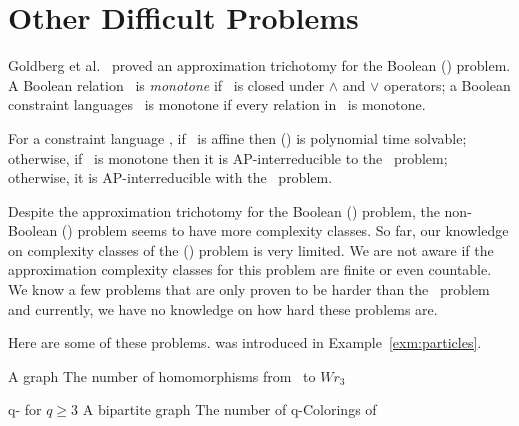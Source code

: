 \section{Other Difficult Problems}
Goldberg et al.~\cite{Trichotomy} proved an approximation trichotomy for the Boolean
\ccsp(\mrelset) problem. A Boolean relation \mR\ is \emph{monotone} if \mR\ is closed under
\(\land\) and \(\lor\) operators; a Boolean constraint languages \mrelset\ is monotone if 
every relation in \mrelset\ is monotone.


\begin{theorem}
For a constraint language \mrelset,
if \mrelset\ is affine then \ccsp(\mrelset) is polynomial time solvable; otherwise,
if \mrelset\ is monotone then it is AP-interreducible to the \cbis\ problem; otherwise,
it is AP-interreducible with the \csat\ problem.
\end{theorem}

Despite the approximation trichotomy for the Boolean \ccsp(\mrelset) problem,
the non-Boolean \ccsp(\mrelset) problem seems to have more complexity classes.
So far, our knowledge on complexity classes of the \ccsp(\mrelset) problem 
is very limited. We are not aware if the approximation
complexity classes for this problem are finite or even countable.
We know a few problems that are only proven to be harder than
the \cbis\ problem \cite{Leslie03} and currently, 
we have no knowledge on how hard these problems are.

Here are some of these problems.  was introduced in
Example~\ref{exm:particles}.

{A graph \mG}
{The number of homomorphisms from \mG\ to \(Wr_3\)}

\pdef
{ q- for \(q\ge 3\)}
{A bipartite graph \mG}
{The number of q-Colorings of \mG}
